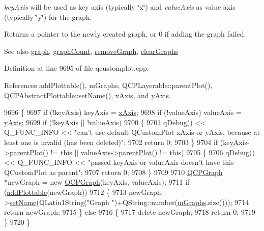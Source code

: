 {\itshape key\+Axis} will be used as key axis (typically \char`\"{}x\char`\"{}) and {\itshape value\+Axis} as value axis (typically \char`\"{}y\char`\"{}) for the graph.

Returns a pointer to the newly created graph, or 0 if adding the graph failed.

\begin{DoxySeeAlso}{See also}
\hyperlink{class_q_custom_plot_a6d3ed93c2bf46ab7fa670d66be4cddaf}{graph}, \hyperlink{class_q_custom_plot_a7d9b4d19114b2fde60f0233eeb0aa682}{graph\+Count}, \hyperlink{class_q_custom_plot_a903561be895fb6528a770d66ac5e6713}{remove\+Graph}, \hyperlink{class_q_custom_plot_ab0f3abff2d2f7df3668b5836f39207fa}{clear\+Graphs} 
\end{DoxySeeAlso}


Definition at line 9695 of file qcustomplot.\+cpp.



References add\+Plottable(), m\+Graphs, Q\+C\+P\+Layerable\+::parent\+Plot(), Q\+C\+P\+Abstract\+Plottable\+::set\+Name(), x\+Axis, and y\+Axis.


\begin{DoxyCode}
9696 \{
9697   \textcolor{keywordflow}{if} (!keyAxis) keyAxis = \hyperlink{class_q_custom_plot_a9a79cd0158a4c7f30cbc702f0fd800e4}{xAxis};
9698   \textcolor{keywordflow}{if} (!valueAxis) valueAxis = \hyperlink{class_q_custom_plot_af6fea5679725b152c14facd920b19367}{yAxis};
9699   \textcolor{keywordflow}{if} (!keyAxis || !valueAxis)
9700   \{
9701     qDebug() << Q\_FUNC\_INFO << \textcolor{stringliteral}{"can't use default QCustomPlot xAxis or yAxis, because at least one is
       invalid (has been deleted)"};
9702     \textcolor{keywordflow}{return} 0;
9703   \}
9704   \textcolor{keywordflow}{if} (keyAxis->\hyperlink{class_q_c_p_layerable_ab7e0e94461566093d36ffc0f5312b109}{parentPlot}() != \textcolor{keyword}{this} || valueAxis->\hyperlink{class_q_c_p_layerable_ab7e0e94461566093d36ffc0f5312b109}{parentPlot}() != \textcolor{keyword}{this})
9705   \{
9706     qDebug() << Q\_FUNC\_INFO << \textcolor{stringliteral}{"passed keyAxis or valueAxis doesn't have this QCustomPlot as parent"};
9707     \textcolor{keywordflow}{return} 0;
9708   \}
9709   
9710   \hyperlink{class_q_c_p_graph}{QCPGraph} *newGraph = \textcolor{keyword}{new} \hyperlink{class_q_c_p_graph}{QCPGraph}(keyAxis, valueAxis);
9711   \textcolor{keywordflow}{if} (\hyperlink{class_q_custom_plot_ab7ad9174f701f9c6f64e378df77927a6}{addPlottable}(newGraph))
9712   \{
9713     newGraph->\hyperlink{class_q_c_p_abstract_plottable_ab79c7ba76bc7fa89a4b3580e12149f1f}{setName}(QLatin1String(\textcolor{stringliteral}{"Graph "})+QString::number(\hyperlink{class_q_custom_plot_adaf8d407d72a725169d7dbed2ee386bb}{mGraphs}.size()));
9714     \textcolor{keywordflow}{return} newGraph;
9715   \} \textcolor{keywordflow}{else}
9716   \{
9717     \textcolor{keyword}{delete} newGraph;
9718     \textcolor{keywordflow}{return} 0;
9719   \}
9720 \}
\end{DoxyCode}


